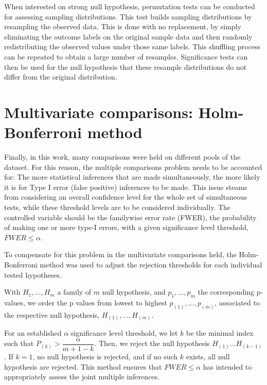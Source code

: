 When interested on strong null hypothesis, permutation tests can be conducted for assessing sampling distributions. This test builds sampling distributions by resampling the observed data. This is done with no replacement, by simply eliminating the outcome labels on the original sample data and then randomly redistributing the observed values under those same labels. This shuffling process can be repeated to obtain a large number of resamples.
Significance tests can then be used for the null hypothesis that these resample distributions do not differ from the original distribution.

\section{Multivariate comparisons: Holm-Bonferroni method}

Finally, in this work, many comparisons were held on different pools of the dataset. For this reason, the multiple comparisons problem needs to be accounted for: The more statistical inferences that are made simultaneously, the more likely it is for Type I error (false positive) inferences to be made. This issue steams from considering an overall confidence level for the whole set of simultaneous tests, while these threshold levels are to be considered individually. The controlled variable should be the familywise error rate (FWER), the probability of making one or more type-I errors, with a given significance level threshold, $FWER \leq \alpha$.

To compensate for this problem in the multivariate comparisons held, the Holm-Bonferroni method was used to adjust the rejection thresholds for each individual tested hypotheses. 

With $H_1,...,H_m$ a family of $m$ null hypothesis, and $p_1,...,p_m$ the corresponding p-values, we order the p values from lowest to highest $p_{(1)},...,p_{(m)}$, associated to the respective null hypothesis, $H_{(1)},...,H_{(m)}$.

For an established $\alpha$ significance level threshold, we let $k$ be the minimal index such that $P_{(k)}> \dfrac{\alpha}{m+1-k}$. Then, we reject the null hypothesis $H_{(1)}...H_{(k-1)}$. If $k=1$, no null hypothesis is rejected, and if no such $k$ exists, all null hypothesis are rejected. This method ensures that $FWER \leq \alpha$ has intended to appropriately assess the joint multiple inferences.